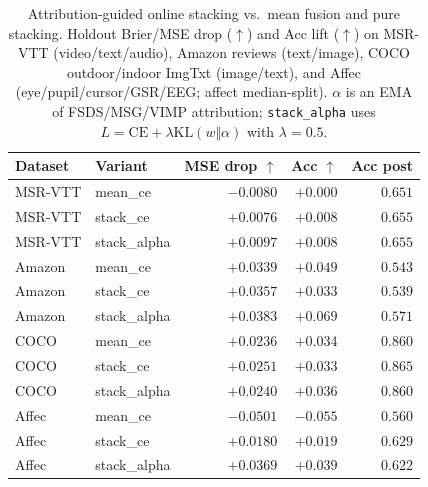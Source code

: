\begin{table}[t]
\centering
\caption{Attribution-guided online stacking vs.\ mean fusion and pure stacking.
Holdout Brier/MSE drop ($\uparrow$) and Acc lift ($\uparrow$) on MSR-VTT (video/text/audio),
Amazon reviews (text/image), COCO outdoor/indoor ImgTxt (image/text), and Affec
(eye/pupil/cursor/GSR/EEG; affect median-split). $\alpha$ is an EMA of FSDS/MSG/VIMP
attribution; \texttt{stack\_alpha} uses $L=\mathrm{CE}+\lambda\mathrm{KL}(w\Vert\alpha)$
with $\lambda=0.5$.}
\label{tab:agod-vimp-stacking}
\begin{tabular}{llrrr}
\toprule
Dataset & Variant & MSE drop $\uparrow$ & Acc $\uparrow$ & Acc post \\
\midrule
MSR-VTT & mean\_ce     & $-0.0080$ & $+0.000$ & $0.651$ \\
MSR-VTT & stack\_ce    & $+0.0076$ & $+0.008$ & $0.655$ \\
MSR-VTT & stack\_alpha & $+0.0097$ & $+0.008$ & $0.655$ \\
\midrule
Amazon  & mean\_ce     & $+0.0339$ & $+0.049$ & $0.543$ \\
Amazon  & stack\_ce    & $+0.0357$ & $+0.033$ & $0.539$ \\
Amazon  & stack\_alpha & $+0.0383$ & $+0.069$ & $0.571$ \\
\midrule
COCO    & mean\_ce     & $+0.0236$ & $+0.034$ & $0.860$ \\
COCO    & stack\_ce    & $+0.0251$ & $+0.033$ & $0.865$ \\
COCO    & stack\_alpha & $+0.0240$ & $+0.036$ & $0.860$ \\
\midrule
Affec   & mean\_ce     & $-0.0501$ & $-0.055$ & $0.560$ \\
Affec   & stack\_ce    & $+0.0180$ & $+0.019$ & $0.629$ \\
Affec   & stack\_alpha & $+0.0369$ & $+0.039$ & $0.622$ \\
\bottomrule
\end{tabular}
\end{table}

